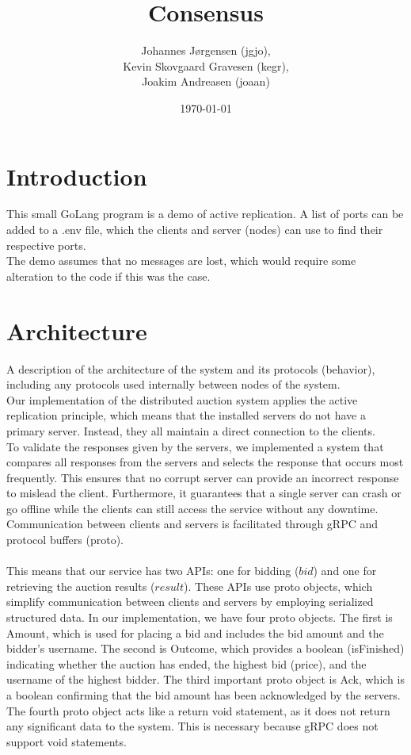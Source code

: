 \documentclass[a4paper,11pt]{article}
\title{Consensus}
\author{Johannes Jørgensen (jgjo),\\ Kevin Skovgaard Gravesen (kegr),\\ Joakim Andreasen (joaan)}
\date{\today}
\begin{document}
 

\maketitle

\section{Introduction}
This small GoLang program is a demo of active replication. A list of ports can be added to a .env file,
which the clients and server (nodes) can use to find their respective ports.
\\
The demo assumes that no messages are lost, which would require some alteration to the code if this was the case.

\section{Architecture}
A description of the architecture of the system and its protocols (behavior), including any protocols used internally between nodes of the system.\\
Our implementation of the distributed auction system applies the active replication principle, which means that the installed servers do not have a primary server. Instead, they all maintain a direct connection to the clients.\\
To validate the responses given by the servers, we implemented a system that compares all responses from the servers and selects the response that occurs most frequently. This ensures that no corrupt server can provide an incorrect response to mislead the client.
Furthermore, it guarantees that a single server can crash or go offline while the clients can still access the service without any downtime. Communication between clients and servers is facilitated through gRPC and protocol buffers (proto).\\\\
This means that our service has two APIs: one for bidding ($bid$) and one for retrieving the auction results ($result$). These APIs use proto objects, which simplify communication between clients and servers by employing serialized structured data.
In our implementation, we have four proto objects. The first is Amount, which is used for placing a bid and includes the bid amount and the bidder’s username. The second is Outcome, which provides a boolean (isFinished) indicating whether the auction has ended, the highest bid (price), and the username of the highest bidder. The third important proto object is Ack, which is a boolean confirming that the bid amount has been acknowledged by the servers.
The fourth proto object acts like a return void statement, as it does not return any significant data to the system. This is necessary because gRPC does not support void statements.
\end{document}
